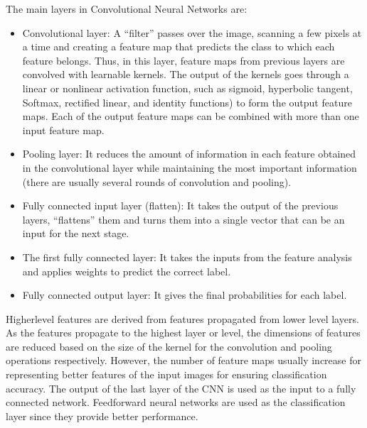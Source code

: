 \documentclass[letterpaper,10pt,english]{jupyterBook}
\begin{document}
\sphinxAtStartPar
The main layers in Convolutional Neural Networks are:
\begin{itemize}
\item {} 
\sphinxAtStartPar
Convolutional layer: A “filter” passes over the image, scanning a
few pixels at a time and creating a feature map that predicts the
class to which each feature belongs. Thus, in this layer, feature
maps from previous layers are convolved with learnable kernels. The
output of the kernels goes through a linear or non\sphinxhyphen{}linear activation
function, such as sigmoid, hyperbolic tangent, Softmax, rectified
linear, and identity functions) to form the output feature maps.
Each of the output feature maps can be combined with more than one
input feature map.

\item {} 
\sphinxAtStartPar
Pooling layer: It reduces the amount of information in each feature
obtained in the convolutional layer while maintaining the most
important information (there are usually several rounds of
convolution and pooling).

\item {} 
\sphinxAtStartPar
Fully connected input layer (flatten): It takes the output of the
previous layers, “flattens” them and turns them into a single vector
that can be an input for the next stage.

\item {} 
\sphinxAtStartPar
The first fully connected layer: It takes the inputs from the
feature analysis and applies weights to predict the correct label.

\item {} 
\sphinxAtStartPar
Fully connected output layer: It gives the final probabilities for
each label.

\end{itemize}

\sphinxAtStartPar
Higher\sphinxhyphen{}level features are derived from features propagated from lower
level layers. As the features propagate to the highest layer or level,
the dimensions of features are reduced based on the size of the kernel
for the convolution and pooling operations respectively. However, the
number of feature maps usually increase for representing better features
of the input images for ensuring classification accuracy. The output of
the last layer of the CNN is used as the input to a fully connected
network. Feed\sphinxhyphen{}forward neural networks are used as the classification
layer since they provide better performance.
\end{document}
